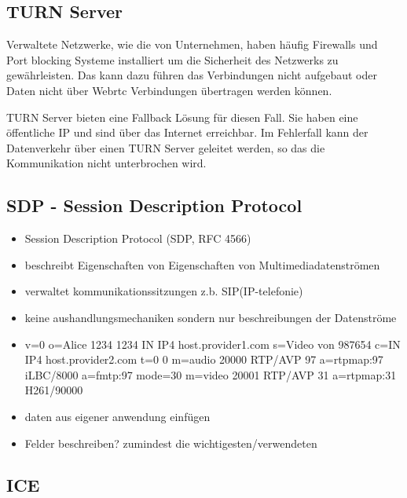 %
%

\subsection{TURN Server}

Verwaltete Netzwerke, wie die von Unternehmen, haben häufig Firewalls und Port blocking Systeme installiert um die Sicherheit des Netzwerks zu gewährleisten. Das kann dazu führen das \webrtc Verbindungen nicht aufgebaut oder Daten nicht über Webrtc Verbindungen übertragen werden können.

TURN Server bieten eine Fallback Lösung für diesen Fall. Sie haben eine öffentliche IP und sind über das Internet erreichbar. Im Fehlerfall kann der Datenverkehr über einen TURN Server geleitet werden, so das die Kommunikation nicht unterbrochen wird.

\subsection{SDP - Session Description Protocol}

\begin{itemize}
	\item Session Description Protocol (SDP, RFC 4566) 
	\item beschreibt Eigenschaften von Eigenschaften von Multimediadatenströmen
	\item verwaltet kommunikationssitzungen z.b. SIP(IP-telefonie)
	\item keine aushandlungsmechaniken sondern nur beschreibungen der Datenströme
	\item v=0
o=Alice 1234 1234 IN IP4 host.provider1.com
s=Video von 987654
c=IN IP4 host.provider2.com
t=0 0
m=audio 20000 RTP/AVP 97
a=rtpmap:97 iLBC/8000
a=fmtp:97 mode=30
m=video 20001 RTP/AVP 31
a=rtpmap:31 H261/90000
	\item daten aus eigener anwendung einfügen
	\item Felder beschreiben? zumindest die wichtigesten/verwendeten
\end{itemize}

\subsection{ICE}

